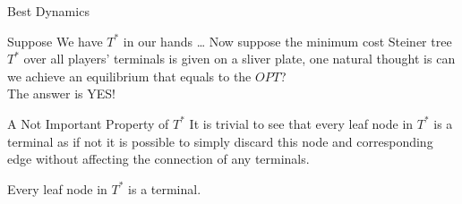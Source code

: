 \documentclass[11pt,aspectratio=169]{beamer}
\begin{document}
\begin{frame}{Best Dynamics}
    \centering
    
\end{frame}

\begin{frame}{Suppose We have $T^*$ in our hands \dots}
Now suppose the minimum cost Steiner tree \(T^*\) over all players' terminals is given on a sliver plate, one natural thought is can we achieve an equilibrium that equals to the \(OPT\)?  \\
\vspace{10pt}
The answer is YES!
\end{frame}

\begin{frame}{A Not Important Property of $T^*$}
    It is trivial to see that every leaf node in \(T^*\) is a terminal as if not it is possible to simply discard this node and corresponding edge without affecting the connection of any terminals.
    \vspace{10pt}
\begin{fact}
	Every leaf node in \(T^*\) is a terminal. 
\end{fact}
\end{frame}
\end{document}
